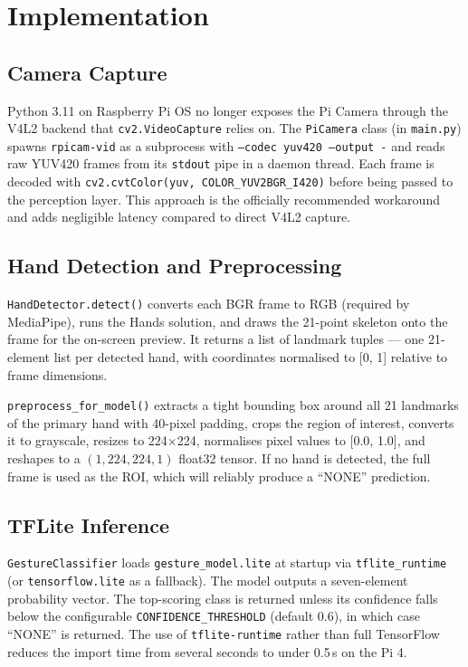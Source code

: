 \documentclass[sigconf, nonacm]{acmart}
\begin{document}
\section{Implementation}

\subsection{Camera Capture}

Python 3.11 on Raspberry Pi OS no longer exposes the Pi Camera through the V4L2 backend that \texttt{cv2.VideoCapture} relies on. The \texttt{PiCamera} class (in \texttt{main.py}) spawns \texttt{rpicam-vid} as a subprocess with \texttt{--codec yuv420 --output -} and reads raw YUV420 frames from its \texttt{stdout} pipe in a daemon thread. Each frame is decoded with \texttt{cv2.cvtColor(yuv, COLOR\_YUV2BGR\_I420)} before being passed to the perception layer. This approach is the officially recommended workaround and adds negligible latency compared to direct V4L2 capture.

\subsection{Hand Detection and Preprocessing}

\texttt{HandDetector.detect()} converts each BGR frame to RGB (required by MediaPipe), runs the Hands solution, and draws the 21-point skeleton onto the frame for the on-screen preview. It returns a list of landmark tuples — one 21-element list per detected hand, with coordinates normalised to [0, 1] relative to frame dimensions.

\texttt{preprocess\_for\_model()} extracts a tight bounding box around all 21 landmarks of the primary hand with 40-pixel padding, crops the region of interest, converts it to grayscale, resizes to 224$\times$224, normalises pixel values to [0.0, 1.0], and reshapes to a $(1, 224, 224, 1)$ float32 tensor. If no hand is detected, the full frame is used as the ROI, which will reliably produce a ``NONE'' prediction.

\subsection{TFLite Inference}

\texttt{GestureClassifier} loads \texttt{gesture\_model.lite} at startup via \texttt{tflite\_runtime} (or \texttt{tensorflow.lite} as a fallback). The model outputs a seven-element probability vector. The top-scoring class is returned unless its confidence falls below the configurable \texttt{CONFIDENCE\_THRESHOLD} (default 0.6), in which case ``NONE'' is returned. The use of \texttt{tflite-runtime} rather than full TensorFlow reduces the import time from several seconds to under 0.5\,s on the Pi 4.
\end{document}
